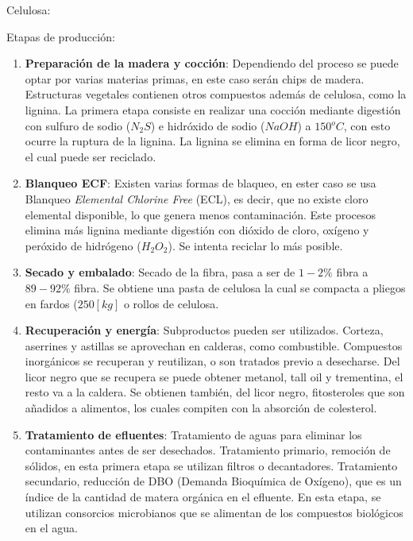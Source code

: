     
        Celulosa: \textit{}
        \newline
        
        Etapas de producción:
        
        \begin{enumerate}
            \item \textbf{Preparación de la madera y cocción}: Dependiendo del proceso se puede optar por varias materias primas, en este caso serán chips de madera. Estructuras vegetales contienen otros compuestos además de celulosa, como la lignina. La primera etapa consiste en realizar una cocción mediante digestión con sulfuro de sodio (\(N_{2}S\)) e hidróxido de sodio (\(NaOH\)) a \(150{}^{o}C\), con esto ocurre la ruptura de la lignina. La lignina se elimina en forma de licor negro, el cual puede ser reciclado.
            \item \textbf{Blanqueo ECF}: Existen varias formas de blaqueo, en ester caso se usa Blanqueo \textit{Elemental Chlorine Free} (ECL), es decir, que no existe cloro elemental disponible, lo que genera menos contaminación. Este procesos elimina más lignina mediante digestión con dióxido de cloro, oxígeno y peróxido de hidrógeno (\(H_{2}O_{2}\)). Se intenta reciclar lo más posible.
            \item \textbf{Secado y embalado}: Secado de la fibra, pasa a ser de \(1-2\%\) fibra a \(89-92\%\) fibra. Se obtiene una pasta de celulosa la cual se compacta a pliegos en fardos (\(250 [kg]\) o rollos de celulosa.
            \item \textbf{Recuperación y energía}: Subproductos pueden ser utilizados. Corteza, aserrines y astillas se aprovechan en calderas, como combustible. Compuestos inorgánicos se recuperan y reutilizan, o son tratados previo a desecharse. Del licor negro que se recupera se puede obtener metanol, tall oil y trementina, el resto va a la caldera. Se obtienen también, del licor negro, fitosteroles que son añadidos a alimentos, los cuales compiten con la absorción de colesterol.
            \item \textbf{Tratamiento de efluentes}: Tratamiento de aguas para eliminar los contaminantes antes de ser desechados. Tratamiento primario, remoción de sólidos, en esta primera etapa se utilizan filtros o decantadores. Tratamiento secundario, reducción de DBO (Demanda Bioquímica de Oxígeno), que es un índice de la cantidad de matera orgánica en el efluente. En esta etapa, se utilizan consorcios microbianos que se alimentan de los compuestos biológicos en el agua.

\end{enumerate}
